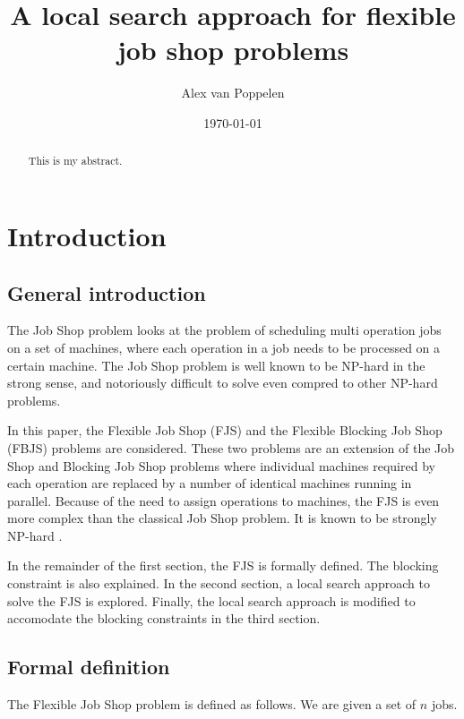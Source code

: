 \documentclass[a4paper,10pt]{article}
\begin{document}
\title{A local search approach for flexible job shop problems}
\author{Alex van Poppelen}
\date{\today}
\maketitle

\begin{abstract}

This is my abstract.

\end{abstract}

\tableofcontents

\section{Introduction}

\subsection{General introduction}

The Job Shop problem looks at the problem of scheduling multi operation jobs on a set of machines, where each operation in a job needs to be processed on a certain machine. The Job Shop problem is well known to be NP-hard in the strong sense, and notoriously difficult to solve even compred to other NP-hard problems.

In this paper, the Flexible Job Shop (FJS) and the Flexible Blocking Job Shop (FBJS) problems are considered. These two problems are an extension of the Job Shop and Blocking Job Shop problems where individual machines required by each operation are replaced by a number of identical machines running in parallel. Because of the need to assign operations to machines, the FJS is even more complex than the classical Job Shop problem. It is known to be strongly NP-hard \cite{approxfjsp}.

In the remainder of the first section, the FJS is formally defined. The blocking constraint is also explained. In the second section, a local search approach to solve the FJS is explored. Finally, the local search approach is modified to accomodate the blocking constraints in the third section.

\subsection{Formal definition}

The Flexible Job Shop problem is defined as follows. We are given a set of $n$ jobs.
\end{document}
